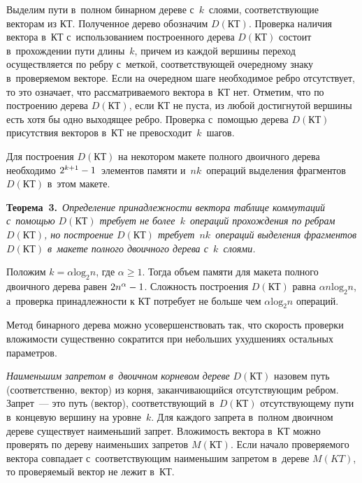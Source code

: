 \begin{multicols}{2}
  Выделим пути в~полном бинарном дереве с~$k$~слоями, соответствующие 
векторам из КТ. Полученное дерево обозначим $D(\mathrm{КТ})$. Проверка наличия 
вектора в~КТ с~использованием построенного дерева $D(\mathrm{КТ})$ состоит 
в~прохождении пути длины~$k$, причем из каждой вершины переход 
осуществляется по ребру с~меткой, соответствующей очередному знаку 
в~проверяемом векторе. Если на очередном шаге необходимое ребро 
отсутствует, то это означает, что рассматриваемого вектора в~КТ нет. Отметим, 
что по построению дерева $D(\mathrm{КТ})$, если КТ не пуста, из любой достигнутой 
вершины есть хотя бы одно выходящее ребро. Проверка с~помощью дерева 
$D(\mathrm{КТ})$ присутствия векторов в~КТ не превосходит~$k$~шагов.
  
  Для построения $D(\mathrm{КТ})$ на некотором макете полного двоичного дерева 
необходимо $2^{k+1}\hm-1$~элементов памяти и~$nk$~операций выделения 
фрагментов $D(\mathrm{КТ})$ в~этом макете.
  
  \smallskip
  
  \noindent
  \textbf{Теорема~3.}\ \textit{Определение принадлежности вектора таблице 
коммутаций с~помощью $D(\mathrm{КТ})$ требует не более~$k$~операций прохождения по 
ребрам $D(\mathrm{КТ})$, но построение $D(\mathrm{КТ})$ требует~$nk$~операций выделения 
фрагментов $D(\mathrm{КТ})$ в~макете полного двоичного дерева с~$k$~слоями.}
  
  \smallskip
  
  Положим $k=\alpha \mathrm{log}_2n$, где $\alpha\geq1$. Тогда объем памяти 
для макета полного двоичного дерева равен $2n^\alpha\hm-1$. Сложность 
построения $D(\mathrm{КТ})$ равна $\alpha n \mathrm{log}_2n$, а~проверка 
принадлежности к КТ потребует не больше чем $\alpha\mathrm{log}_2 n$ 
операций. 
  
  Метод бинарного дерева можно усовершенствовать так, что скорость 
проверки вложимости существенно сократится при небольших ухудшениях 
остальных параметров. 
  
  \textit{Наименьшим запретом в~двоичном корневом дереве} $D(\mathrm{КТ})$ назовем 
путь (соответственно, вектор) из корня, заканчивающийся отсутствующим 
реб\-ром. Запрет~--- это путь (вектор), соответствующий в~$D(\mathrm{КТ})$ 
отсутствующему пути в~концевую вершину на уровне~$k$. Для каждого 
запрета в~полном двоичном дереве существует наименьший запрет. 
Вложимость вектора в~КТ можно проверять по дереву наименьших запретов 
$M(\mathrm{КТ})$. Если начало проверяемого вектора совпадает с~со\-от\-вет\-ст\-ву\-ющим 
наименьшим запретом в~дереве $M(KT)$, то проверяемый вектор не лежит 
в~КТ. 
  

\end{multicols}
